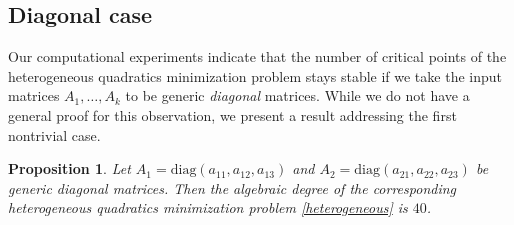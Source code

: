 \documentclass[12pt]{extarticle}
\newtheorem{proposition}[theorem]{Proposition}
\theoremstyle{definition}
\numberwithin{theorem}{section}
\begin{document}
\subsection{Diagonal case}
Our computational experiments indicate that the number of critical points of the heterogeneous quadratics minimization problem stays stable if we take the input matrices $A_1, \ldots, A_k$ to be generic {\it diagonal} matrices. While we do not have a general proof for this observation, we present a result addressing the first nontrivial case. 
\begin{proposition} \label{prop:diagonal-3-2}
 Let $A_1 = \mathrm{diag}(a_{11}, a_{12}, a_{13})$ and $A_2 = \mathrm{diag}(a_{21}, a_{22}, a_{23})$ be generic diagonal matrices. Then the algebraic degree of the corresponding heterogeneous quadratics minimization problem \eqref{heterogeneous} is $40$.   
\end{proposition}
\end{document}
